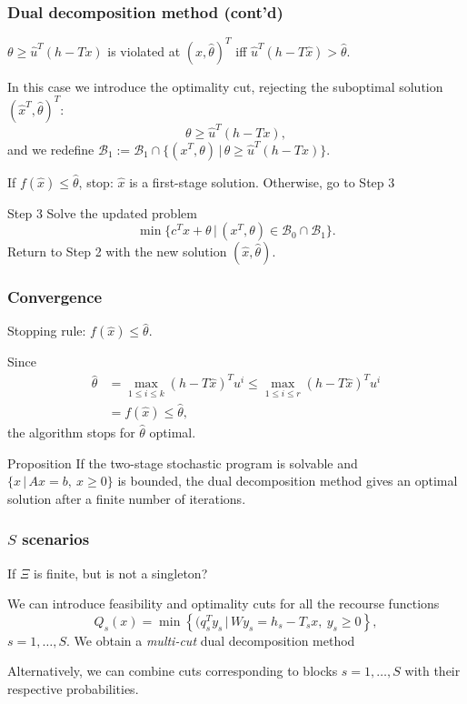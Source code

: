 \documentclass{beamer}
\begin{document}
\begin{frame}
\frametitle{Dual decomposition method (cont'd)}

$\theta \geq \hat{u}^T(h-Tx)$ is violated at $(\hat{x}, \hat{\theta})^T$
iff $\hat{u}^T(h-T\hat{x}) > \hat{\theta}$.

In this case we introduce the optimality cut, rejecting the suboptimal solution $(\hat{x}^T, \hat{\theta})^T$:
\[
\theta \geq \hat{u}^T (h-Tx),
\]
and we redefine $\mathcal{B}_1 := \mathcal{B}_1 \cap \lbrace (x^T,
\theta) \,|\, \theta \geq \hat{u}^T (h-Tx) %
\rbrace$.

\mbox{}

If $f(\hat{x}) \leq \hat{\theta}$, stop: $\hat{x}$ is a first-stage solution.
Otherwise, go to Step 3

\mbox{}

{\red Step 3}
Solve the updated problem
\[
\min \lbrace c^Tx + \theta \,|\, (x^T, \theta) \in \mathcal{B}_0 \cap
\mathcal{B}_1 \rbrace.
\]
Return to Step 2 with the new solution $(\hat{x}, \hat{\theta})$.

\end{frame}

\begin{frame}
\frametitle{Convergence}

{\blue Stopping rule}: $f(\hat{x}) \leq \hat{\theta}$.

Since
\begin{align*}
\hat{\theta} &= \max_{1 \leq i \leq k} (h-T\hat{x})^Tu^i
\leq \max_{1 \leq i \leq r} (h-T\hat{x})^Tu^i \\
&= f(\hat{x}) \leq \hat{\theta},
\end{align*}
the algorithm stops for $\hat{\theta}$ optimal.


\begin{block}{Proposition}
If the two-stage stochastic program is solvable and $\lbrace x
\,|\, Ax=b,\ x \geq 0 \rbrace$ is bounded, the dual decomposition method gives an optimal solution after a finite number of iterations.
\end{block}

\end{frame}

\begin{frame}
\frametitle{$S$ scenarios}

If $\Xi$ is finite, but is not a singleton?

\mbox{}

We can introduce feasibility and optimality cuts for all the recourse functions
\[
Q_{s}(x) = \min \left\lbrace (q_{s}^T y_{s} \,|\, Wy_{s} = h_{s}-T_{s}x,\ y_{s} \geq 0 \right\rbrace,
\]
$s = 1,\ldots,S$.
We obtain a {\sl \red multi-cut} dual decomposition method

\mbox{}

Alternatively, we can combine cuts corresponding to blocks $s = 1,\ldots,S$ with their respective probabilities.

\end{frame}
\end{document}
